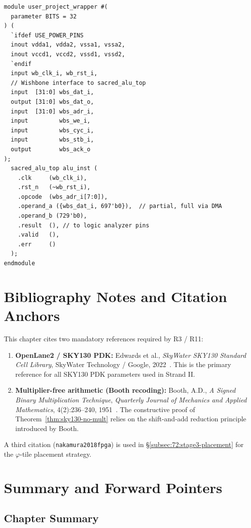\begin{verbatim}
module user_project_wrapper #(
  parameter BITS = 32
) (
  `ifdef USE_POWER_PINS
  inout vdda1, vdda2, vssa1, vssa2,
  inout vccd1, vccd2, vssd1, vssd2,
  `endif
  input wb_clk_i, wb_rst_i,
  // Wishbone interface to sacred_alu_top
  input  [31:0] wbs_dat_i,
  output [31:0] wbs_dat_o,
  input  [31:0] wbs_adr_i,
  input         wbs_we_i,
  input         wbs_cyc_i,
  input         wbs_stb_i,
  output        wbs_ack_o
);
  sacred_alu_top alu_inst (
    .clk     (wb_clk_i),
    .rst_n   (~wb_rst_i),
    .opcode  (wbs_adr_i[7:0]),
    .operand_a ({wbs_dat_i, 697'b0}),  // partial, full via DMA
    .operand_b (729'b0),
    .result  (), // to logic analyzer pins
    .valid   (),
    .err     ()
  );
endmodule
\end{verbatim}

\section{Bibliography Notes and Citation Anchors}
\label{sec:72:bib-notes}

This chapter cites two mandatory references required by R3 / R11:

\begin{enumerate}
  \item \textbf{OpenLane2 / SKY130 PDK:}
    Edwards et al., \emph{SkyWater SKY130 Standard Cell Library},
    SkyWater Technology / Google, 2022~\cite{edwards2022sky130}.
    This is the primary reference for all SKY130 PDK parameters used
    in Strand II.
  \item \textbf{Multiplier-free arithmetic (Booth recoding):}
    Booth, A.D., \emph{A Signed Binary Multiplication Technique},
    \textit{Quarterly Journal of Mechanics and Applied Mathematics},
    4(2):236--240, 1951~\cite{booth1951signed}.
    The constructive proof of Theorem~\ref{thm:sky130-no-mult} relies
    on the shift-and-add reduction principle introduced by Booth.
\end{enumerate}

\noindent
A third citation (\texttt{nakamura2018fpga}) is used in
\S\ref{subsec:72:stage3-placement} for the $\varphi$-tile placement
strategy.

\section{Summary and Forward Pointers}
\label{sec:72:summary}

\subsection{Chapter Summary}
\label{subsec:72:chapter-summary}


